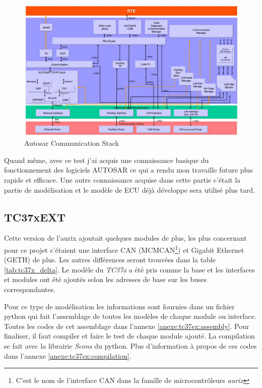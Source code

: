 \begin{figure}[!htb] 
\centering 
\includegraphics[width=\textwidth]{img/autosar_com_stack.png} 
\caption{Autosar Communication Stack\cite{sock_adp_man}} 
\label{fig:autosar-com-stack} 
\end{figure} 

Quand même, avec ce test j'ai acquis une connaissance basique du fonctionnement des logiciels AUTOSAR ce qui a rendu mon travaille future plus rapide et efficace. Une autre connaissance acquise dans cette partie c'était la partie de modélisation et le modèle de ECU déjà développe sera utilisé plus tard. 

\subsection{TC37xEXT} 

  

Cette version de l'aurix ajoutait quelques modules de plus, les plus concernant pour ce projet c'étaient une interface CAN (MCMCAN\footnote{C'est le nom de l'interface CAN dans la famille de microcontrôleurs \textit{aurix}}) et Gigabit Ethernet (GETH) de plus. Les autres différences seront trouvées dans la table \ref{tab:tc37x_delta}. Le modèle du \textit{TC37x}\cite{aurix.tc37x} a été pris comme la base et les interfaces et modules ont été ajout\'es selon les adresses de base sur les buses correspondantes. 

 

Pour ce type de modélisation les informations sont fournies dans un fichier python qui fait l'assemblage de toutes les modèles de chaque module ou interface. Toutes les codes de cet assemblage dans l'annexe \ref{anexe:tc37ex:assembly}. Pour finaliser, il faut compiler et faire le test de chaque module ajout\'e. La compilation se fait avec la librairie \textit{Scons}\cite{scons} du python. Plus d'information à propos de ces codes dans l'annexe \ref{anexe:tc37ex:compilation}. 

